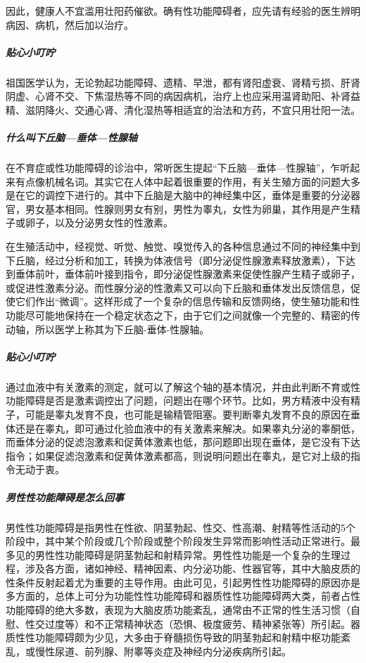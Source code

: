 因此，健康人不宜滥用壮阳药催欲。确有性功能障碍者，应先请有经验的医生辨明病因、病机，然后加以治疗。

\subparagraph{贴心小叮咛}

祖国医学认为，无论勃起功能障碍、遗精、早泄，都有肾阳虚衰、肾精亏损、肝肾阴虚、心肾不交、下焦湿热等不同的病因病机，治疗上也应采用温肾助阳、补肾益精、滋阴降火、交通心肾、清化湿热等相适宜的治法和方药，不宜只用壮阳一法。

\subparagraph{什么叫下丘脑—垂体—性腺轴}

在不育症或性功能障碍的诊治中，常听医生提起“下丘脑—垂体—性腺轴”，乍听起来有点像机械名词。其实它在人体中起着很重要的作用，有关生殖方面的问题大多是在它的调控下进行的。其中下丘脑是大脑中的神经集中区，垂体是重要的分泌器官，男女基本相同。性腺则男女有别，男性为睾丸，女性为卵巢，其作用是产生精子或卵子，以及分泌男女性的性激素。

在生殖活动中，经视觉、听觉、触觉、嗅觉传入的各种信息通过不同的神经集中到下丘脑，经过分析和加工，转换为体液信号（即分泌促性腺激素释放激素），下达到垂体前叶，垂体前叶接到指令，即分泌促性腺激素来促使性腺产生精子或卵子，或促进性激素分泌。而性腺分泌的性激素又可以向下丘脑和垂体发出反馈信息，促使它们作出“微调”。这样形成了一个复杂的信息传输和反馈网络，使生殖功能和性功能尽可能地保持在一个稳定状态之下，由于它们之间就像一个完整的、精密的传动轴，所以医学上称其为下丘脑-垂体-性腺轴。

\subparagraph{贴心小叮咛}

通过血液中有关激素的测定，就可以了解这个轴的基本情况，并由此判断不育或性功能障碍是否是激素调控出了问题，问题出在哪个环节。比如，男方精液中没有精子，可能是睾丸发育不良，也可能是输精管阻塞。要判断睾丸发育不良的原因在垂体还是在睾丸，即可通过化验血液中的有关激素来解决。如果睾丸分泌的睾酮低，而垂体分泌的促滤泡激素和促黄体激素也低，那问题即出现在垂体，是它没有下达指令；如果促滤泡激素和促黄体激素都高，则说明问题出在睾丸，是它对上级的指令无动于衷。

\subparagraph{男性性功能障碍是怎么回事}

男性性功能障碍是指男性在性欲、阴茎勃起、性交、性高潮、射精等性活动的5个阶段中，其中某个阶段或几个阶段或整个阶段发生异常而影响性活动正常进行。最多见的男性性功能障碍是阴茎勃起和射精异常。男性性功能是一个复杂的生理过程，涉及各方面，诸如神经、精神因素、内分泌功能、性器官等，其中大脑皮质的性条件反射起着尤为重要的主导作用。由此可见，引起男性性功能障碍的原因亦是多方面的，总体上可分为功能性性功能障碍和器质性性功能障碍两大类，前者占性功能障碍的绝大多数，表现为大脑皮质功能紊乱，通常由不正常的性生活习惯（自慰、性交过度等）和不正常精神状态（恐惧、极度疲劳、精神紧张等）所引起。器质性性功能障碍颇为少见，大多由于脊髓损伤导致的阴茎勃起和射精中枢功能紊乱，或慢性尿道、前列腺、附睾等炎症及神经内分泌疾病所引起。

